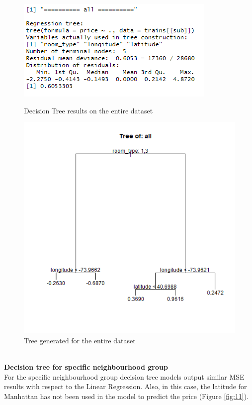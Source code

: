 \documentclass{FR16}
\begin{document}
\begin{figure}[!htb]
   \begin{minipage}{0.48\textwidth}
     \centering
     \includegraphics[width=.7\linewidth]{figures/dt.PNG} 
     \caption{Decision Tree results on the entire dataset}\label{fig:9}
   \end{minipage}\hfill
   \begin{minipage}{0.48\textwidth}
     \centering
     \includegraphics[width=.7\linewidth]{figures/tree-all.PNG}
     \caption{Tree generated for the entire dataset}\label{fig:10}
   \end{minipage}
\end{figure}


\noindent \\ \textbf{Decision tree for specific neighbourhood group}\\
\noindent For the specific neighbourhood group decision tree models output similar MSE results with respect to the Linear Regression. Also, in this case, the latitude for Manhattan has not been used in the model to predict the price (Figure \ref{fig:11}). 
\end{document}
